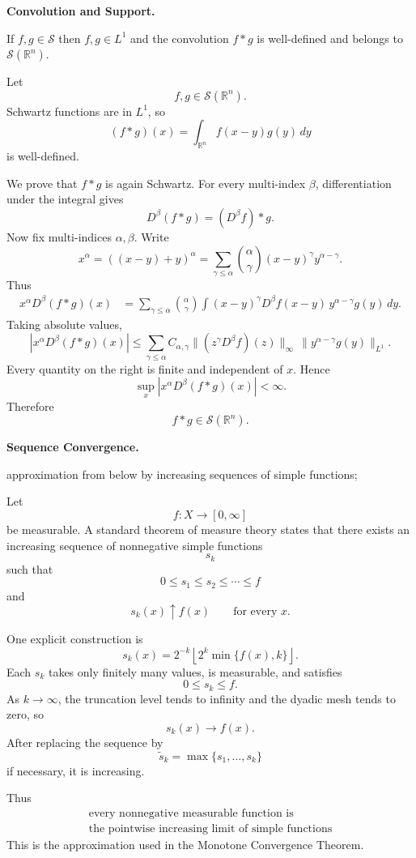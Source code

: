 \begin{problem}[CP-II-0327]
\label{prob:cp-ii-0327}
\textbf{Convolution and Support.}

\hspace*{1.5em}If $f,g\in\mathcal{S}$ then $f,g\in L^1$ and the convolution
	$f*g$ is well-defined and belongs to $\mathcal{S}(\mathbb{R}^n)$.
\end{problem}

\begin{solution}
Let
\[
f,g\in\mathcal S(\mathbb R^n).
\]
Schwartz functions are in \(L^1\), so
\[
(f*g)(x)
=
\int_{\mathbb R^n}f(x-y)g(y)\,dy
\]
is well-defined.

We prove that \(f*g\) is again Schwartz. For every multi-index \(\beta\),
differentiation under the integral gives
\[
D^\beta(f*g)
=
(D^\beta f)*g.
\]
Now fix multi-indices \(\alpha,\beta\). Write
\[
x^\alpha
=
((x-y)+y)^\alpha
=
\sum_{\gamma\le\alpha}
{\alpha\choose\gamma}
(x-y)^\gamma y^{\alpha-\gamma}.
\]
Thus
\[
\begin{aligned}
x^\alpha D^\beta(f*g)(x)
&=
\sum_{\gamma\le\alpha}
{\alpha\choose\gamma}
\int
(x-y)^\gamma D^\beta f(x-y)\,
y^{\alpha-\gamma}g(y)\,dy.
\end{aligned}
\]
Taking absolute values,
\[
|x^\alpha D^\beta(f*g)(x)|
\le
\sum_{\gamma\le\alpha}
C_{\alpha,\gamma}
\|(z^\gamma D^\beta f)(z)\|_\infty
\,
\|y^{\alpha-\gamma}g(y)\|_{L^1}.
\]
Every quantity on the right is finite and independent of \(x\). Hence
\[
\sup_x
|x^\alpha D^\beta(f*g)(x)|
<\infty.
\]
Therefore
\[
\boxed{
f*g\in\mathcal S(\mathbb R^n).
}
\]
\end{solution}


\begin{problem}[CP-II-0329]
\label{prob:cp-ii-0329}
\textbf{Sequence Convergence.}

\hspace*{1.5em}approximation from below by increasing sequences of simple functions;
\end{problem}

\begin{solution}
Let
\[
f:X\to[0,\infty]
\]
be measurable. A standard theorem of measure theory states that there exists an increasing
sequence of nonnegative simple functions
\[
s_k
\]
such that
\[
0\le s_1\le s_2\le\cdots\le f
\]
and
\[
s_k(x)\uparrow f(x)
\qquad
\text{for every }x.
\]

One explicit construction is
\[
s_k(x)
=
2^{-k}
\left\lfloor
2^k\min\{f(x),k\}
\right\rfloor.
\]
Each \(s_k\) takes only finitely many values, is measurable, and satisfies
\[
0\le s_k\le f.
\]
As \(k\to\infty\), the truncation level tends to infinity and the dyadic mesh tends to zero,
so
\[
s_k(x)\to f(x).
\]
After replacing the sequence by
\[
\widetilde s_k=\max\{s_1,\ldots,s_k\}
\]
if necessary, it is increasing.

Thus
\[
\boxed{\begin{gathered}
\text{every nonnegative measurable function is}
\\
\text{the pointwise increasing limit of simple functions}
\end{gathered}}
\]
This is the approximation used in the Monotone Convergence Theorem.
\end{solution}



